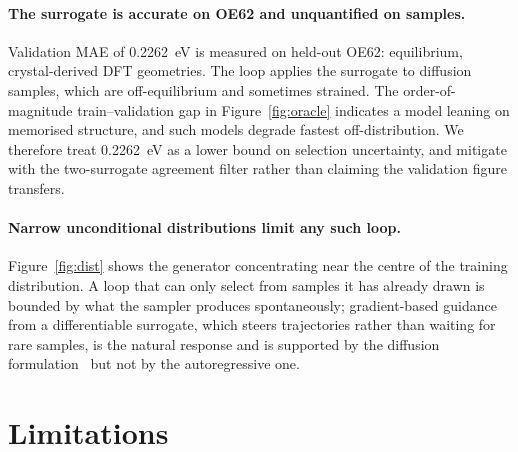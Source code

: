 \documentclass[runningheads]{llncs}
\begin{document}
\paragraph{The surrogate is accurate on OE62 and unquantified on
samples.} Validation MAE of \SI{0.2262}{\electronvolt} is measured on
held-out OE62: equilibrium, crystal-derived DFT geometries. The loop
applies the surrogate to diffusion samples, which are off-equilibrium
and sometimes strained. The order-of-magnitude train--validation gap in
Figure~\ref{fig:oracle} indicates a model leaning on memorised
structure, and such models degrade fastest off-distribution. We
therefore treat \SI{0.2262}{\electronvolt} as a lower bound on selection
uncertainty, and mitigate with the two-surrogate agreement filter rather
than claiming the validation figure transfers.

\paragraph{Narrow unconditional distributions limit any such loop.}
Figure~\ref{fig:dist} shows the generator concentrating near the centre
of the training distribution. A loop that can only select from samples
it has already drawn is bounded by what the sampler produces
spontaneously; gradient-based guidance from a differentiable surrogate,
which steers trajectories rather than waiting for rare samples, is the
natural response and is supported by the diffusion
formulation~\cite{le2023} but not by the autoregressive one.

\section{Limitations}
\end{document}
